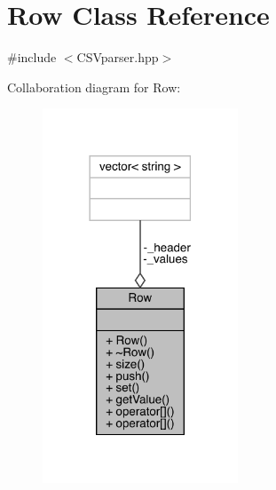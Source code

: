 \hypertarget{class_row}{}\section{Row Class Reference}
\label{class_row}


{\ttfamily \#include $<$C\+S\+Vparser.\+hpp$>$}



Collaboration diagram for Row\+:
\nopagebreak
\begin{figure}[H]
\begin{center}
\leavevmode
\includegraphics[width=165pt]{class_row__coll__graph}
\end{center}
\end{figure}
